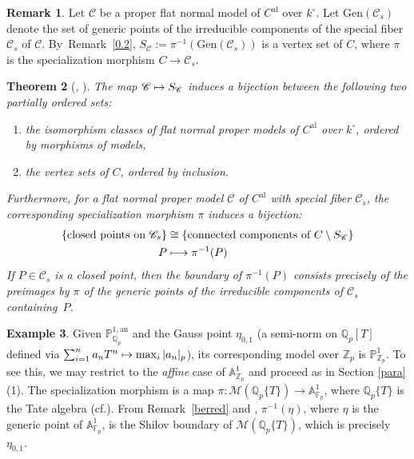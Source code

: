 \documentclass[10pt]{amsart}
\newcommand{\cf}{cf.}
\newcommand{\mto}{\mathchoice{\longmapsto}{\mapsto}{\mapsto}{\mapsto}}
\newcommand{\al}{\mathrm{al}}
\let\backslash\setminus
\newtheorem{thm}{Theorem}[section]
\theoremstyle{definition}
\newtheorem{rem}[thm]{Remark}
\newtheorem{ex}[thm]{Example}
\begin{document}
\begin{rem} \label{psejo} Let $\mathscr{C}$ be a proper flat normal model of $C^{\al}$ over $k^{\circ}$. Let $\mathrm{Gen}(\mathscr{C}_s)$ denote the set of generic points of the irreducible components of the special fiber~$\mathscr{C}_s$ of $\mathscr{C}$. By~Remark~\ref{0.2}, $S_{\mathscr{C}}:=\pi^{-1}(\mathrm{Gen}(\mathscr{C}_s))$ is a vertex set of $C$, where $\pi$ is the specialization morphism ${C \to \mathscr{C}_s}$.
\end{rem}
\begin{thm}[{\cite[Th.\,4.3]{lordan}, \cite[6.3.14]{duc}}] \label{lordan}
The map $\mathscr{C} \mto S_{\mathscr{C}}$ induces a bijection between the following two partially ordered sets:
\begin{enumerate}
\item the isomorphism classes of flat normal proper models of $C^{\al}$ over $k^{\circ}$, ordered by morphisms of models,
\item the vertex sets of $C$, ordered by inclusion.
\end{enumerate}
Furthermore, for a flat normal proper model $\mathscr{C}$ of $C^{\al}$ with special fiber $\mathscr{C}_s$, the corresponding specialization morphism $\pi$ induces a bijection:
\[
\begin{aligned}
\{\text{closed points on } \mathscr{C}_s\} & \cong \{\text{connected components of } C \backslash S_{\mathscr{C}}\} \\
P & \mto \pi^{-1}(P)
\end{aligned}
\]
If $P \in \mathscr{C}_s$ is a closed point, then the boundary of $\pi^{-1}(P)$ consists precisely of the preimages by $\pi$ of the generic points of the irreducible components of $\mathscr{C}_s$ containing~$P$.
\end{thm}

\begin{ex} \label{shembulli}
Given $\mathbb{P}_{\mathbb{Q}_p}^{1, \mathrm{an}}$ and the Gauss point $\eta_{0,1}$ (a semi-norm on $\mathbb{Q}_p[T]$ defined via $\sum_{i=1}^n a_n T^n \mto \max_i |a_n|_p$), its corresponding model over $\mathbb{Z}_p$ is $\mathbb{P}_{\mathbb{Z}_p}^1$. To see this, we may restrict to the \emph{affine} case of $\mathbb{A}_{\mathbb{Z}_p}^1$ and proceed as in Section \ref{para}(1). The specialization morphism is a map $\pi: \mathcal{M}(\mathbb{Q}_p\{T\}) \to \mathbb{A}_{\mathbb{F}_p}^1$, where $\mathbb{Q}_p\{T\}$ is the Tate algebra \hbox{(\cf \cite[2.1]{Ber90})}. From Remark~\ref{berred} and \cite[Prop.\,2.4.4]{Ber90}, $\pi^{-1}(\eta)$, where $\eta$ is the generic point of $\mathbb{A}_{\mathbb{F}_p}^1$, is the Shilov boundary of $\mathcal{M}(\mathbb{Q}_p\{T\})$, which is precisely $\eta_{0,1}$.
\end{ex}
\end{document}
